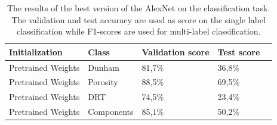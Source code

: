 \begin{table}
\caption[Scores of best performing AlexNet]{\label{tab:alexbest} The results of the best version of the AlexNet on the classification task. The validation and test accuracy are used as score on the single label classification while F1-scores are used for multi-label classification.}
\centering
\begin{tabular}[b]{| l | l | l | l | l |}
\hline
    Initialization & Class & Validation score & Test score  \\ \hline
    Pretrained Weights & Dunham &  81,7\%  & 36,8\% \\ \hline
    Pretrained Weights & Porosity & 88,5\%  &  69,5\% \\ \hline
    Pretrained Weights &DRT & 74,5\% &  23,4\% \\ \hline
    Pretrained Weights &Components & 85,1\% &  50,2\% \\ \hline
\end{tabular} 
\end{table}


